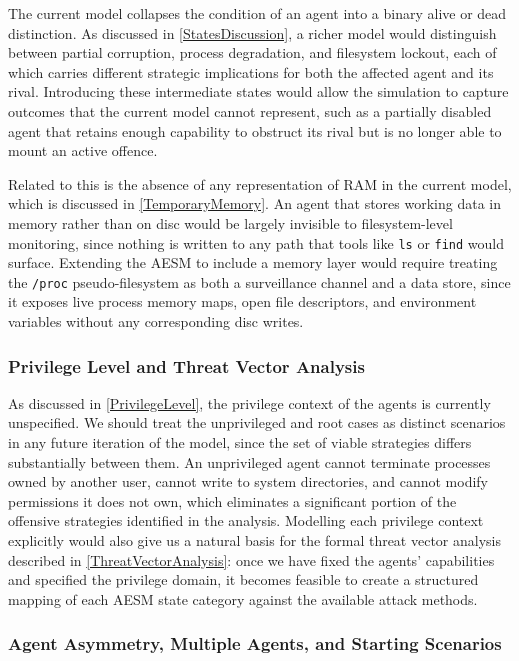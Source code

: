 The current model collapses the condition of an agent into a binary alive or dead distinction. As discussed in \autoref{StatesDiscussion}, a richer model would distinguish between partial corruption, process degradation, and filesystem lockout, each of which carries different strategic implications for both the affected agent and its rival. Introducing these intermediate states would allow the simulation to capture outcomes that the current model cannot represent, such as a partially disabled agent that retains enough capability to obstruct its rival but is no longer able to mount an active offence.

Related to this is the absence of any representation of RAM in the current model, which is discussed in \autoref{TemporaryMemory}. An agent that stores working data in memory rather than on disc would be largely invisible to filesystem-level monitoring, since nothing is written to any path that tools like \texttt{ls} or \texttt{find} would surface. Extending the AESM to include a memory layer would require treating the \texttt{/proc} pseudo-filesystem as both a surveillance channel and a data store, since it exposes live process memory maps, open file descriptors, and environment variables without any corresponding disc writes.

\subsubsection{Privilege Level and Threat Vector Analysis}
\label{PrivilegeThreatVector}

As discussed in \autoref{PrivilegeLevel}, the privilege context of the agents is currently unspecified. We should treat the unprivileged and root cases as distinct scenarios in any future iteration of the model, since the set of viable strategies differs substantially between them. An unprivileged agent cannot terminate processes owned by another user, cannot write to system directories, and cannot modify permissions it does not own, which eliminates a significant portion of the offensive strategies identified in the analysis. Modelling each privilege context explicitly would also give us a natural basis for the formal threat vector analysis described in \autoref{ThreatVectorAnalysis}: once we have fixed the agents' capabilities and specified the privilege domain, it becomes feasible to create a structured mapping of each AESM state category against the available attack methods.

\subsubsection{Agent Asymmetry, Multiple Agents, and Starting Scenarios}
\label{AsymmetryMultipleAgentsScenarios}

